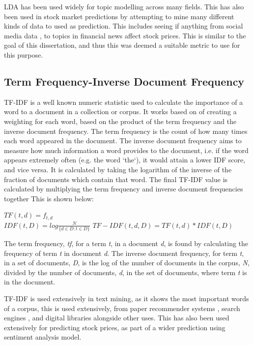 LDA has been used widely for topic modelling across many fields.  This has also been used in stock market predictions by attempting to mine many different kinds of data to used as prediction. This includes seeing if anything from social media data \cite{nguyen2015sentiment}, to topics in financial news \cite{feuerriegel2016analysis} affect stock prices. This is similar to the goal of this dissertation, and thus this was deemed a suitable metric to use for this purpose. 
 \subsection{Term Frequency-Inverse Document Frequency}
 TF-IDF is a well known numeric statistic used to calculate the importance of a word to a document in a collection or corpus. It works based on of creating a weighting for each word, based on the product of the term frequency and the inverse document frequency. The term frequency is the count of how many times each word appeared in the document. The inverse document frequency aims to measure how much information a word provides to the document, i.e. if the word appears extremely often (e.g. the word `the`), it would attain a lower IDF score, and vice versa. It is calculated by taking the logarithm of the inverse of the fraction of documents which contain that word. The final TF-IDF value is calculated by multiplying the term frequency and inverse document frequencies together This is shown below:
 
 \begin{center}
 	$TF(t,d) = f_{t,d}$\\
 	$IDF(t, D) = log\frac{N}{\{d \in D : t \in D\}}$
 	$TF-IDF(t, d, D) = TF(t, d) * IDF(t, D) $
 \end{center}
 
The term frequency, \textit{tf}, for a term \textit{t}, in a document \textit{d}, is found by calculating the frequency of term \textit{t} in document \textit{d}. The inverse document frequency, for term \textit{t}, in a set of documents, \textit{D}, is the log of the number of documents in the corpus, \textit{N},  divided by the number of documents, \textit{d}, in the set of documents, where term \textit{t} is in the document.  
 
 TF-IDF is used extensively in text mining, as it shows the most important words of a corpus, this is used extensively, from paper recommender systems \cite{beel2016paper}, search engines \cite{xu2014pos}, and digital libraries \cite{philip2014application} alongside other uses. This has also been used extensively for predicting stock prices, as part of a wider prediction using sentiment analysis model. 
 
